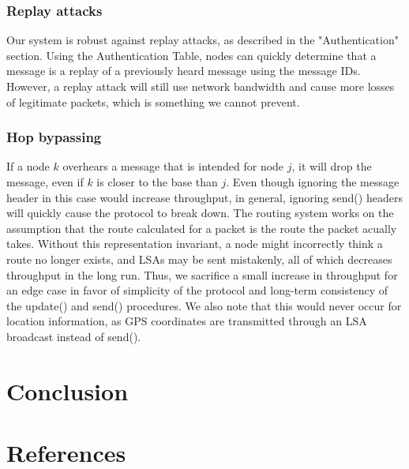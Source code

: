 \documentclass[letterpaper]{article}
\begin{document}
\subsubsection{Replay attacks}

Our system is robust against replay attacks, as described in the "Authentication" section. Using the Authentication Table, nodes can quickly determine that a message is a replay of a previously heard message using the message IDs. However, a replay attack will still use network bandwidth and cause more losses of legitimate packets, which is something we cannot prevent.

\subsubsection{Hop bypassing}

If a node $k$ overhears a message that is intended for node $j$, it will drop the message, even if $k$ is closer to the base than $j$. Even though ignoring the message header in this case would increase throughput, in general, ignoring send() headers will quickly cause the protocol to break down. The routing system works on the assumption that the route calculated for a packet is the route the packet acually takes. Without this representation invariant, a node might incorrectly think a route no longer exists, and LSAs may be sent mistakenly, all of which decreases throughput in the long run. Thus, we sacrifice a small increase in throughput for an edge case in favor of simplicity of the protocol and long-term consistency of the update() and send() procedures. We also note that this would never occur for location information, as GPS coordinates are transmitted through an LSA broadcast instead of send(). 

\section{Conclusion}

\section{References}
\end{document}
